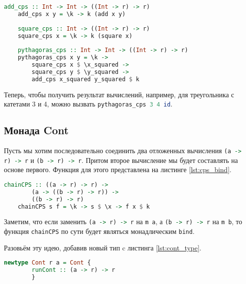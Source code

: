 \documentclass[times]{itmo-student-thesis}
\begin{document}
\begin{lstlisting}[language=Haskell,float=!h,caption={Теорема Пифагора в CPS},label={lst:pythagoras_cps}]
    add_cps :: Int -> Int -> ((Int -> r) -> r)
    add_cps x y = \k -> k (add x y)
    
    square_cps :: Int -> ((Int -> r) -> r)
    square_cps x = \k -> k (square x)
    
    pythagoras_cps :: Int -> Int -> ((Int -> r) -> r)
    pythagoras_cps x y = \k ->
        square_cps x $ \x_squared ->
        square_cps y $ \y_squared ->
        add_cps x_squared y_squared $ k
\end{lstlisting}

Теперь, чтобы получить результат вычислений, например, для треугольника с катетами 3 и 4, можно вызвать \lstinline[language=Haskell]{pythagoras_cps 3 4 id}.

\subsection{Монада Cont}\label{sec:cps_monad}

Пусть мы хотим последовательно соединить два
отложенных вычисления \lstinline[language=Haskell]{(a -> r) -> r} и \lstinline[language=Haskell]{(b -> r) -> r}. 
Притом второе вычисление мы будет составлять на основе первого. Функция для этого представлена на листинге \ref{lst:cps_bind}.

\begin{lstlisting}[language=Haskell,float=!h,caption={Соединение отложенных вычислений},label={lst:cps_bind}]
    chainCPS :: ((a -> r) -> r) -> 
        (a -> ((b -> r) -> r)) -> 
        ((b -> r) -> r)
    chainCPS s f = \k -> s $ \x -> f x $ k
\end{lstlisting}


Заметим, что если заменить \lstinline[language=Haskell]{(a -> r) -> r} на \lstinline[language=Haskell]{m a}, а 
\lstinline[language=Haskell]{(b -> r) -> r} на \lstinline[language=Haskell]{m b}, то функция \lstinline[language=Haskell]{chainCPS}
по сути будет являться монадлическим \lstinline[language=Haskell]{bind}.

Разовьём эту идею, добавив новый тип c листинга \ref{lst:cont_type}.

\begin{lstlisting}[language=Haskell,float=!h,caption={Тип Cont},label={lst:cont_type}]
    newtype Cont r a = Cont { 
        runCont :: (a -> r) -> r 
        }
\end{lstlisting}
\end{document}
